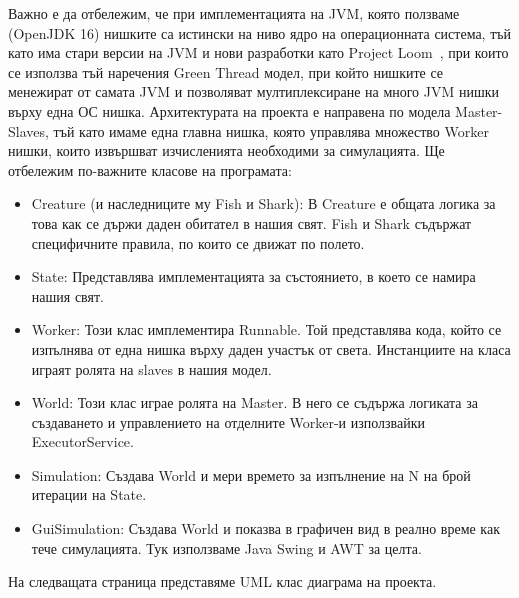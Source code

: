 \documentclass[12pt]{article}
\begin{document}
Важно е да отбележим, че при имплементацията на JVM, която ползваме (OpenJDK 16) нишките са истински
на ниво ядро на операционната система, тъй като има стари версии на JVM и нови разработки като Project Loom~\cite{loom},
при които се използва тъй наречения Green Thread модел, при който нишките се менежират от самата JVM 
и позволяват мултиплексиране на много JVM нишки върху една ОС нишка.
\bigbreak
Архитектурата на проекта е направена по модела Master-Slaves, тъй като имаме една главна нишка,
която управлява множество Worker нишки, които извършват изчисленията необходими за симулацията.
\bigbreak
Ще отбележим по-важните класове на програмата:
\begin{itemize}
	\item Creature (и наследниците му Fish и Shark): В Creature е общата логика за това как се държи
		даден обитател в нашия свят. Fish и Shark съдържат специфичните правила, по които се движат
		по полето.
	\item State: Представлява имплементацията за състоянието, в което се намира нашия свят.
	\item Worker: Този клас имплементира Runnable. Той представлява кода, който се изпълнява от една нишка
		върху даден участък от света. Инстанциите на класа играят ролята на slaves в нашия модел.
	\item World: Този клас играе ролята на Master. В него се съдържа логиката за създаването и управлението на отделните
		Worker-и използвайки ExecutorService.
	\item Simulation: Създава World и мери времето за изпълнение на N на брой итерации на State.
	\item GuiSimulation: Създава World и показва в графичен вид в реално време как тече симулацията.
		Тук използваме Java Swing и AWT за целта.
\end{itemize}

На следващата страница представяме UML клас диаграма на проекта.

\newpage
\end{document}
